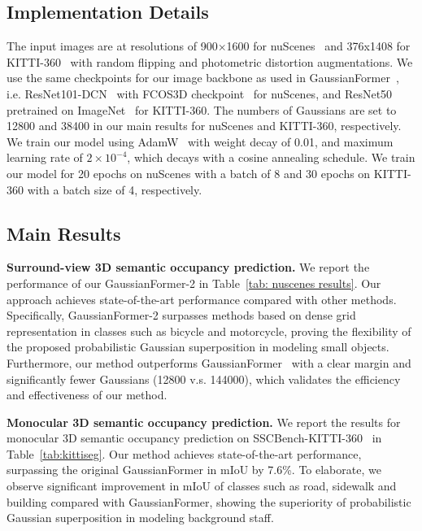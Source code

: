 \subsection{Implementation Details}
The input images are at resolutions of 900$\times$1600 for nuScenes~\cite{caesar2020nuscenes} and 376x1408 for KITTI-360~\cite{Liao2022kitti360} with random flipping and photometric distortion augmentations. 
We use the same checkpoints for our image backbone as used in GaussianFormer~\cite{huang2024gaussian}, i.e. ResNet101-DCN~\cite{he2016resnet} with FCOS3D checkpoint~\cite{wang2021fcos3d} for nuScenes, and ResNet50~\cite{he2016resnet} pretrained on ImageNet~\cite{deng2009imagenet} for KITTI-360. 
The numbers of Gaussians are set to 12800 and 38400 in our main results for nuScenes and KITTI-360, respectively. 
We train our model using AdamW~\cite{loshchilov2017adamw} with weight decay of 0.01, and maximum learning rate of $2\times 10^{-4}$, which decays with a cosine annealing schedule. 
We train our model for 20 epochs on nuScenes with a batch of 8 and 30 epochs on KITTI-360 with a batch size of 4, respectively.

\subsection{Main Results}

\textbf{Surround-view 3D semantic occupancy prediction.}
We report the performance of our GaussianFormer-2 in Table~\ref{tab: nuscenes results}.
Our approach achieves state-of-the-art performance compared with other methods.
Specifically, GaussianFormer-2 surpasses methods based on dense grid representation in classes such as bicycle and motorcycle, proving the flexibility of the proposed probabilistic Gaussian superposition in modeling small objects.
Furthermore, our method outperforms GaussianFormer~\cite{huang2024gaussian} with a clear margin and significantly fewer Gaussians (12800 v.s. 144000), which validates the efficiency and effectiveness of our method.


        
        
        
        

        



        
        


\textbf{Monocular 3D semantic occupancy prediction.}
We report the results for monocular 3D semantic occupancy prediction on SSCBench-KITTI-360~\cite{li2023sscbench} in Table~\ref{tab:kittiseg}.
Our method achieves state-of-the-art performance, surpassing the original GaussianFormer in mIoU by 7.6\%.
To elaborate, we observe significant improvement in mIoU of classes such as road, sidewalk and building compared with GaussianFormer, showing the superiority of probabilistic Gaussian superposition in modeling background staff.

